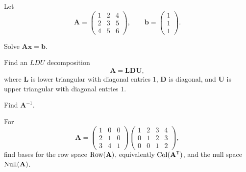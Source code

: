 \begin{problem}
Let
\[
\mathbf A=
\begin{pmatrix}
1&2&4\\
2&3&5\\
4&5&6
\end{pmatrix},
\qquad
\mathbf b=
\begin{pmatrix}
1\\1\\1
\end{pmatrix}.
\]
\begin{problemsubparts}
\item Solve $\mathbf A\mathbf x=\mathbf b$.
\item Find an $LDU$ decomposition
\[
\mathbf A=\mathbf L\mathbf D\mathbf U,
\]
where $\mathbf L$ is lower triangular with diagonal entries $1$, $\mathbf D$ is diagonal, and $\mathbf U$ is upper triangular with diagonal entries $1$.
\item Find $\mathbf A^{-1}$.
\end{problemsubparts}
\end{problem}

\begin{problem}
For
\[
\mathbf A=
\begin{pmatrix}
1&0&0\\
2&1&0\\
3&4&1
\end{pmatrix}
\begin{pmatrix}
1&2&3&4\\
0&1&2&3\\
0&0&1&2
\end{pmatrix},
\]
find bases for the row space $\operatorname{Row}(\mathbf A)$, equivalently $\operatorname{Col}(\mathbf A^{\mathsf T})$, and the null space $\operatorname{Null}(\mathbf A)$.
\end{problem}

